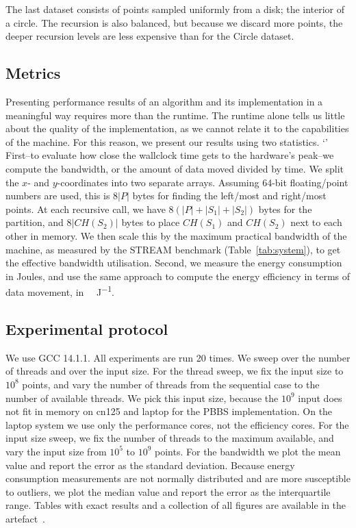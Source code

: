 The last dataset consists of points sampled uniformly from a disk; the interior of a circle.
The recursion is also balanced, but because we discard more points, the deeper recursion levels are less expensive than for the Circle dataset.

\subsection{Metrics}\label{sec:metrics}
Presenting performance results of an algorithm and its implementation in a meaningful way requires more than the runtime.
The runtime alone tells us little about the quality of the implementation, as we cannot relate it to the capabilities of the machine.
For this reason, we present our results using two statistics.
`'
First\---to evaluate how close the wallclock time gets to the hardware's peak\---we compute the bandwidth, or the amount of data moved divided by time.
We split the $x$- and $y$-coordinates into two separate arrays.
Assuming 64-bit floating\-/point numbers are used, this is $8|P|$ bytes for finding the left\-/most and right\-/most points.
At each recursive call, we have $8(|P| + |S_1| + |S_2|)$ bytes for the partition, and $8|CH(S_2)|$ bytes to place $CH(S_1)$ and $CH(S_2)$ next to each other in memory.
We then scale this by the maximum practical bandwidth of the machine, as measured by the STREAM benchmark (Table~\ref{tab:system}), to get the effective bandwidth utilisation.
Second, we measure the energy consumption in Joules, and use the same approach to compute the energy efficiency in terms of data movement, in \si{\giga\byte\per\joule}.

\subsection{Experimental protocol}
We use GCC 14.1.1.
All experiments are run \num{20} times.
We sweep over the number of threads and over the input size.
For the thread sweep, we fix the input size to $10^8$ points, and vary the number of threads from the sequential case to the number of available threads.
We pick this input size, because the $10^9$ input does not fit in memory on cn125 and laptop for the PBBS implementation.
On the laptop system we use only the performance cores, not the efficiency cores.
For the input size sweep, we fix the number of threads to the maximum available, and vary the input size from $10^5$ to $10^9$ points.
For the bandwidth we plot the mean value and report the error as the standard deviation.
Because energy consumption measurements are not normally distributed and are more susceptible to outliers, we plot the median value and report the error as the interquartile range.
Tables with exact results and a collection of all figures are available in the artefact~\cite{vqhull2025artefact}.

